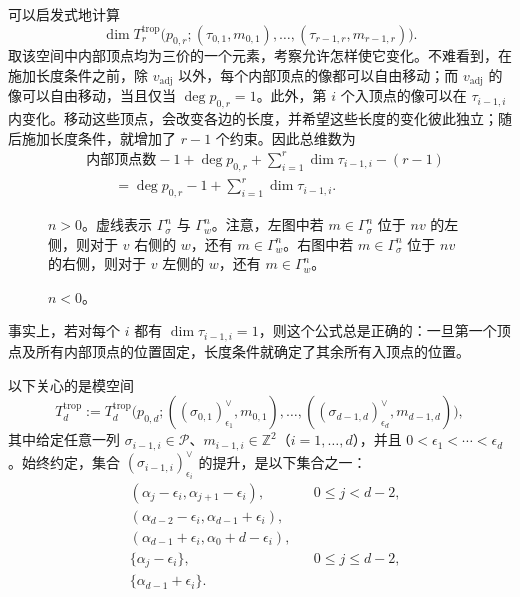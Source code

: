 可以启发式地计算
\[
\dim T_r^{\mathrm{trop}}\bigl(p_{0,r};(\tau_{0,1},m_{0,1}),\ldots,
(\tau_{r-1,r},m_{r-1,r})\bigr).
\]
取该空间中内部顶点均为三价的一个元素，考察允许怎样使它变化。不难看到，在施加长度条件之前，除 $v_{\mathrm{adj}}$ 以外，每个内部顶点的像都可以自由移动；而 $v_{\mathrm{adj}}$ 的像可以自由移动，当且仅当 $\deg p_{0,r}=1$。此外，第 $i$ 个入顶点的像可以在 $\tau_{i-1,i}$ 内变化。移动这些顶点，会改变各边的长度，并希望这些长度的变化彼此独立；随后施加长度条件，就增加了 $r-1$ 个约束。因此总维数为
\[
\begin{aligned}
&\text{内部顶点数}-1+\deg p_{0,r}
+\sum_{i=1}^r\dim\tau_{i-1,i}-(r-1)\\
&\qquad=\deg p_{0,r}-1+\sum_{i=1}^r\dim\tau_{i-1,i}.
\end{aligned}
\]
\begin{figure}[H]
\centering
{}
\caption{$n>0$。虚线表示 $\Gamma_\sigma^n$ 与 $\Gamma_w^n$。注意，左图中若 $m\in\Gamma_\sigma^n$ 位于 $nv$ 的左侧，则对于 $v$ 右侧的 $w$，还有 $m\in\Gamma_w^n$。右图中若 $m\in\Gamma_\sigma^n$ 位于 $nv$ 的右侧，则对于 $v$ 左侧的 $w$，还有 $m\in\Gamma_w^n$。}\label{fig:8.38}
\end{figure}
\begin{figure}[H]
\centering
{}
\caption{$n<0$。}\label{fig:8.39}
\end{figure}

事实上，若对每个 $i$ 都有 $\dim\tau_{i-1,i}=1$，则这个公式总是正确的：一旦第一个顶点及所有内部顶点的位置固定，长度条件就确定了其余所有入顶点的位置。

以下关心的是模空间
\[
T_d^{\mathrm{trop}}
:=T_d^{\mathrm{trop}}\bigl(p_{0,d};
((\sigma_{0,1})_{\epsilon_1}^\vee,m_{0,1}),\ldots,
((\sigma_{d-1,d})_{\epsilon_d}^\vee,m_{d-1,d})\bigr),
\]
其中给定任意一列 $\sigma_{i-1,i}\in\mathcal P$、$m_{i-1,i}\in\mathbb Z^2$（$i=1,\ldots,d$），并且 $0<\epsilon_1<\cdots<\epsilon_d$。始终约定，集合 $(\sigma_{i-1,i})_{\epsilon_i}^\vee$ 的提升，是以下集合之一：
\[
\begin{aligned}
&(\alpha_j-\epsilon_i,\alpha_{j+1}-\epsilon_i),
&&0\leq j<d-2,\\
&(\alpha_{d-2}-\epsilon_i,\alpha_{d-1}+\epsilon_i),\\
&(\alpha_{d-1}+\epsilon_i,\alpha_0+d-\epsilon_i),\\
&\{\alpha_j-\epsilon_i\},&&0\leq j\leq d-2,\\
&\{\alpha_{d-1}+\epsilon_i\}.
\end{aligned}
\]


